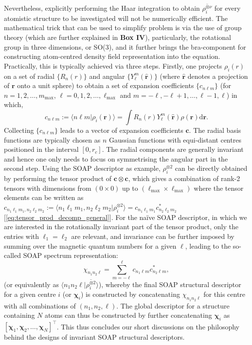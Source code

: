 Nevertheless, explicitly performing the Haar integration to obtain $\overline{\rho^{\otimes \nu}_i}$ for every atomistic structure to be investigated will not be numerically efficient.  The mathematical trick that can be used to simplify problem is via the use of group theory (which are further explained in \textbf{Box IV}), particularly, the rotational group in three dimensions, or SO(3), and it further brings the bra-component for constructing atom-centred density field representation into the equation. Practically, this is typically achieved via three steps. Firstly, one projects $\rho_{i}(r)$ on a set of radial $\{R_n(r)\}$ and angular $\{Y_{\ell}^{m}(\hat{\bm{r}})\}$ (where $\hat{\bm{r}}$ denotes a projection of $\bm{r}$ onto a unit sphere) to obtain a set of expansion coefficients $\{c_{n\ell m}\}$ (for $n=1,2,\ldots,m_{\max}$, $\ell=0,1,2,\ldots,\ell_{\max}$ and $m=-\ell,-\ell+1,\ldots,\ell-1,\ell$) in which,
\begin{equation}
    \label{eq:soap_expansion_coeff}
    c_{n\ell m}:=\langle n\ell m|\rho_i(\bm{r})\rangle=\int R_{n}(r)Y_{\ell}^{m}(\hat{\bm{r}})\rho(\bm{r})\mathrm{d}\bm{r}.
\end{equation}
Collecting $\{c_{n\ell m}\}$ leads to a vector of expansion coefficients $\bm{c}$. The radial basis functions are typically chosen as $n$ Gaussian functions with equi-distant centres positioned in the interval $[0,r_c]$. The radial components are generally invariant and hence one only needs to focus on symmetrising the angular part in the second step.
Using the SOAP descriptor as example, $\rho^{\otimes2}_i$ can be directly obtained by performing the tensor product of $\bm{c}\otimes\bm{c}$, which gives a combination of rank-2 tensors with dimensions from $(0\times0)$ up to $(\ell_{\max}\times\ell_{\max})$ where the tensor elements can be written as $c_{n_1\ell_1 m_1,n_2\ell_2 m_2}:=\langle n_1\ell_1 m_1,n_2\ell_2 m_2 |\rho^{\otimes 2}_i\rangle=c_{n_1\ell_1 m_1}c^{*}_{n_2\ell_2 m_2}$ [\cref{eq:tensor_prod_decomp_general}]. For the na\"{i}ve SOAP descriptor,\cite{bartok2013representing} in which we are  interested in the rotationally invariant part of the tensor product, only the entries with $\ell_1=\ell_2$ are relevant, and invariance can be further imposed by summing over the magnetic quantum numbers for a given $\ell$, leading to the so-called SOAP spectrum representation:
\begin{equation}
\label{eq:SOAP_spectrum}
\chi_{n_1n_2\ell}=\sum_{m=-\ell}^{\ell}c_{n_1\ell m}c^{*}_{n_2\ell m},
\end{equation}
(or equivalently as $\langle n_1n_2\ell|\overline{\rho^{\otimes 2}_i}\rangle$),
whereby the final SOAP structural descriptor for a given centre $i$ (or $\boldsymbol{\chi}_i$) is constructed by concatenating  $\chi_{n_1n_2\ell}$ for this centre with all combinations of $(n_1,n_2,\ell)$. The global descriptor for a structure containing $N$ atoms can thus be constructed by further concatenating $\boldsymbol{\chi}_i$ as $[\boldsymbol{\chi}_1,\boldsymbol{\chi}_2,\ldots,\boldsymbol{\chi}_N]^\top$. This thus concludes our short discussions on the philosophy behind the designs of invariant SOAP structural descriptors. 
 
